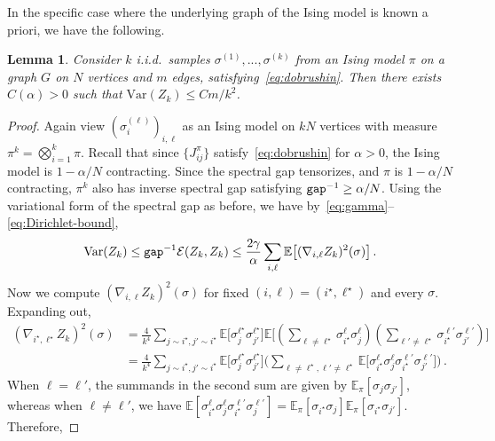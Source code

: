 \documentclass[reqno,11pt]{amsart}
\numberwithin{equation}{section}
\newtheorem{lemma}[theorem]{Lemma}
\theoremstyle{definition}{
\newtheorem{example}[theorem]{Example}
\newtheorem{definition}[theorem]{Definition}
\newtheorem*{definition*}{Definition}
\newtheorem{problem}[theorem]{Problem}
\newtheorem{question}[theorem]{Question}
\newtheorem{remark}[theorem]{Remark}
}
\newcommand{\gap}{\text{\tt{gap}}}
\begin{document}
In the specific case where the underlying graph of the Ising model is known a priori, we have the following.

\begin{lemma}\label{lem:var-z-k}
Consider $k$ i.i.d.\ samples $\sigma^{(1)},...,\sigma^{(k)}$ from an Ising model $\pi$ on a graph $G$ on $N$ vertices and $m$ edges, satisfying~\eqref{eq:dobrushin}. Then there exists $C(\alpha)>0$ such that $\mathrm{Var}(Z_k) \leq Cm/k^2$. 
\end{lemma}

\begin{proof}
Again view $(\sigma_{i}^{(\ell)})_{i,\ell}$ as an Ising model on $kN$ vertices with measure $\pi^k = \bigotimes_{i=1}^k \pi$. Recall that since $\{J^\pi_{ij}\}$ satisfy~\eqref{eq:dobrushin} for $\alpha>0$, the Ising model is $1-\alpha/N$ contracting. Since the spectral gap tensorizes, and $\pi$ is $1-\alpha/N$ contracting, $\pi^k$ also has inverse spectral gap satisfying $\gap^{-1} \geq \alpha/N$. Using the variational form of the spectral gap as before, we have by~\eqref{eq:gamma}--\eqref{eq:Dirichlet-bound},
\begin{align*}
\mathrm{Var}(Z_k) \leq \gap^{-1}\mathcal E(Z_k,Z_k) \leq \frac{2\gamma}{\alpha} \sum_{i,\ell} \mathbb E \big[ (\nabla_{i,\ell} Z_k)^2 (\sigma)\big]\,.
\end{align*}
Now we compute $(\nabla_{i,\ell} Z_k)^2(\sigma)$ for fixed $(i,\ell)=(i^\star,\ell^\star)$ and every $\sigma$. Expanding out, 
\begin{align*}
(\nabla_{i^\star,\ell^\star} Z_k)^2(\sigma) & =  \frac 4{k^4} \sum_{j\sim i^\star, j'\sim i^\star} \mathbb E\big[\sigma_j^{\ell^\star} \sigma_{j'}^{\ell^\star}\big]\mathbb E\big[ (\sum_{\ell \neq \ell^{\star}} \sigma_{i^\star}^{\ell}\sigma_j^{\ell})(\sum_{\ell' \neq \ell^{\star}} \sigma_{i^\star}^{\ell'}\sigma_{j'}^{\ell'})\big] \\ 
& = \frac {4}{k^4} \sum_{j\sim i^{\star}, j'\sim i^{\star}} \mathbb E\big[ \sigma_j^{\ell^\star} \sigma_{j'}^{\ell^\star}\big]
\bigg( \sum_{\ell\neq \ell^{\star},\ell' \neq \ell^{\star}} \mathbb E\big[\sigma_{i^\star}^{\ell}\sigma_{j}^{\ell} \sigma_{i^{\star}}^{\ell'}\sigma_{j'}^{\ell'}\big] \bigg)\,.
\end{align*}
When $\ell = \ell'$, the summands in the second sum are given by $\mathbb E_{\pi} [\sigma_j \sigma_{j'}]$, whereas when $\ell \neq \ell'$, we have $\mathbb E[\sigma_{i^\star}^{\ell} \sigma_j^{\ell}\sigma_{i^\star}^{\ell'} \sigma_j^{\ell'}] = \mathbb E_{\pi}[\sigma_{i^{\star}}\sigma_j]\mathbb E_{\pi} [ \sigma_{i^\star} \sigma_{j'}]$. Therefore, 

\end{proof}
\end{document}
